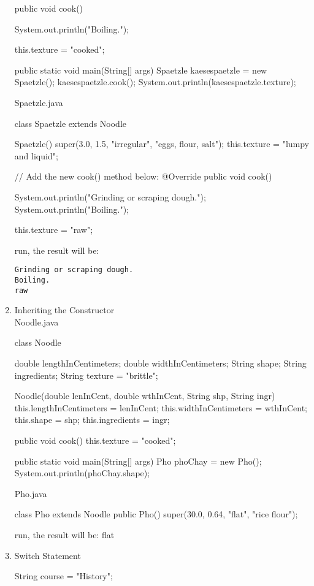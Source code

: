 \documentclass[a4paper,12pt]{article}
\begin{document}
\begin{enumerate}
\begin{javacode}
{  public void cook() {
    System.out.println("Boiling.");
    
    this.texture = "cooked";
  }
  
  public static void main(String[] args) {    
    Spaetzle kaesespaetzle = new Spaetzle();
    kaesespaetzle.cook();
    System.out.println(kaesespaetzle.texture);    
  }  
}
\end{javacode}
Spaetzle.java
\begin{javacode}
class Spaetzle extends Noodle {  
  Spaetzle() {    
    super(3.0, 1.5, "irregular", "eggs, flour, salt");
    this.texture = "lumpy and liquid";    
  }
  
  // Add the new cook() method below:
  @Override
  public void cook() {
    System.out.println("Grinding or scraping dough.");
    System.out.println("Boiling.");
    
    this.texture = "raw";
  }  
}
\end{javacode}
run, the result will be:
\begin{verbatim}
Grinding or scraping dough.
Boiling.
raw
\end{verbatim}

\item Inheriting the Constructor\\
Noodle.java
\begin{javacode}
class Noodle {
  double lengthInCentimeters;
  double widthInCentimeters;
  String shape;
  String ingredients;
  String texture = "brittle";
  
  Noodle(double lenInCent, double wthInCent, String shp, String ingr) {
    this.lengthInCentimeters = lenInCent;
    this.widthInCentimeters = wthInCent;
    this.shape = shp;
    this.ingredients = ingr;
  }
  
  public void cook() {
    this.texture = "cooked";
  }
  
  public static void main(String[] args) {
    Pho phoChay = new Pho();
    System.out.println(phoChay.shape);
  }
}
\end{javacode}

Pho.java
\begin{javacode}
class Pho extends Noodle {
  public Pho() {
    super(30.0, 0.64, "flat", "rice flour");
  }
}
\end{javacode}
run, the result will be: flat

\item Switch Statement
\begin{javacode}
String course = "History";


\end{javacode}
\end{enumerate}
\end{document}
